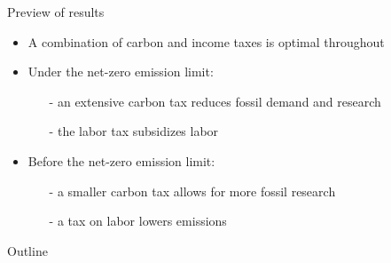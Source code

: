 \documentclass[11pt,aspectratio=169]{beamer}
\begin{document}
\begin{frame}{Preview of results}
	\vspace{-3mm}
	\pause
\begin{itemize}[<+-| alert@+>]
	\item A combination of carbon and income taxes is optimal throughout
\vspace{2mm}
\item \normalsize{Under the net-zero emission limit:}
\vspace{1mm}
\begin{itemize}
	\item[-]  \normalsize{an extensive carbon tax reduces fossil demand and research}
		\vspace{1mm}
	\item[-] \normalsize{the labor tax subsidizes labor}
\end{itemize}
\vspace{2mm}
\item \normalsize{Before the net-zero emission limit:}
\vspace{1mm}
\begin{itemize}
	\item[-] \normalsize{a smaller carbon tax allows for more fossil research}
	\vspace{1mm}
	\item[-] \normalsize{a tax on labor lowers emissions}
\end{itemize}	
\end{itemize}
\end{frame}

%
\begin{frame}{Outline}
	\tableofcontents
\end{frame}
\end{document}
